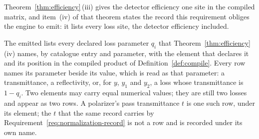 
Theorem~\ref{thm:efficiency}\,(iii) gives the detector efficiency one site in the
compiled matrix, and item~(iv) of that theorem states the record this
requirement obliges the engine to emit: it lists every loss site, the detector
efficiency included.

\begin{requirement}\label{req:efficiency-record}
The emitted  lists every declared loss parameter
$q_i$ that Theorem~\ref{thm:efficiency}\,(iv) names, by catalogue entry and
parameter, with the element that declares it and its position in the compiled
product of Definition~\ref{def:compile}. Every row names its parameter beside
its value, which is read as that parameter: a transmittance, a reflectivity,
or, for $y$, $y_1$ and $y_2$, a loss whose transmittance is $1-q_i$. Two
elements may carry equal numerical values; they are still two losses and
appear as two rows. A polarizer's pass transmittance $t$ is one such row,
under its element; the  $t$ that the same record carries by
Requirement~\ref{req:normalization-record} is not a row and is recorded under
its own name.
\end{requirement}
